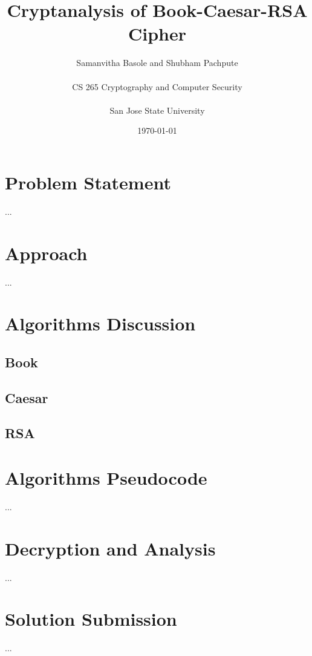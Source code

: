 \documentclass[12pt]{article}
\title{Cryptanalysis of Book-Caesar-RSA Cipher}
\author{Samanvitha Basole and Shubham Pachpute\\
\\
CS 265 Cryptography and Computer Security\\
\\
San Jose State University
}
\date{\today}
\begin{document}
\maketitle

\section{Problem Statement}
...

\section{Approach}
...

\section{Algorithms Discussion}
\subsection{Book}
\subsection{Caesar}
\subsection{RSA}

\section{Algorithms Pseudocode}
...

\section{Decryption and Analysis}
...

\section{Solution Submission}
...



\end{document}
